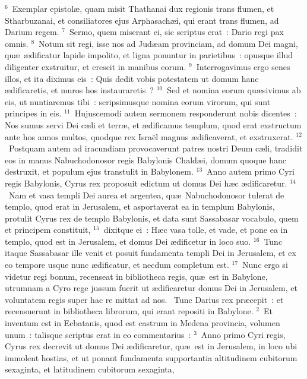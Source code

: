 ${}^{6}$~Exemplar epistol\ae , quam misit Thathanai dux regionis trans flumen, et Stharbuzanai, et consiliatores ejus Arphasach\ae i, qui erant trans flumen, ad Darium regem.
${}^{7}$~Sermo, quem miserant ei, sic scriptus erat~: Dario regi pax omnis.
${}^{8}$~Notum sit regi, isse nos ad Jud\ae am provinciam, ad domum Dei magni, qu\ae\ \ae dificatur lapide impolito, et ligna ponuntur in parietibus~: opusque illud diligenter exstruitur, et crescit in manibus eorum.
${}^{9}$~Interrogavimus ergo senes illos, et ita diximus eis~: Quis dedit vobis potestatem ut domum hanc \ae dificaretis, et muros hos instauraretis~?
${}^{10}$~Sed et nomina eorum qu\ae sivimus ab eis, ut nuntiaremus tibi~: scripsimusque nomina eorum virorum, qui sunt principes in eis.
${}^{11}$~Hujuscemodi autem sermonem responderunt nobis dicentes~: Nos sumus servi Dei c\ae li et terr\ae , et \ae dificamus templum, quod erat exstructum ante hos annos multos, quodque rex Isra\"el magnus \ae dificaverat, et exstruxerat.
${}^{12}$~Postquam autem ad iracundiam provocaverunt patres nostri Deum c\ae li, tradidit eos in manus Nabuchodonosor regis Babylonis Chald\ae i, domum quoque hanc destruxit, et populum ejus transtulit in Babylonem.
${}^{13}$~Anno autem primo Cyri regis Babylonis, Cyrus rex proposuit edictum ut domus Dei h\ae c \ae dificaretur.
${}^{14}$~Nam et vasa templi Dei aurea et argentea, qu\ae\ Nabuchodonosor tulerat de templo, quod erat in Jerusalem, et asportaverat ea in templum Babylonis, protulit Cyrus rex de templo Babylonis, et data sunt Sassabasar vocabulo, quem et principem constituit,
${}^{15}$~dixitque ei~: H\ae c vasa tolle, et vade, et pone ea in templo, quod est in Jerusalem, et domus Dei \ae dificetur in loco suo.
${}^{16}$~Tunc itaque Sassabasar ille venit et posuit fundamenta templi Dei in Jerusalem, et ex eo tempore usque nunc \ae dificatur, et necdum completum est.
${}^{17}$~Nunc ergo si videtur regi bonum, recenseat in bibliotheca regis, qu\ae\ est in Babylone, utrumnam a Cyro rege jussum fuerit ut \ae dificaretur domus Dei in Jerusalem, et voluntatem regis super hac re mittat ad nos.
~Tunc Darius rex pr\ae cepit~: et recensuerunt in bibliotheca librorum, qui erant repositi in Babylone.
${}^{2}$~Et inventum est in Ecbatanis, quod est castrum in Medena provincia, volumen unum~: talisque scriptus erat in eo commentarius~:
${}^{3}$~Anno primo Cyri regis, Cyrus rex decrevit ut domus Dei \ae dificaretur, qu\ae\ est in Jerusalem, in loco ubi immolent hostias, et ut ponant fundamenta supportantia altitudinem cubitorum sexaginta, et latitudinem cubitorum sexaginta,
